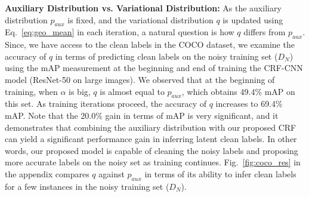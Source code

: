 \documentclass{article}
\begin{document}
\textbf{Auxiliary Distribution vs. Variational Distribution:} As the auxiliary distribution $p_{aux}$ is fixed, and the variational distribution $q$ is updated using Eq.~\ref{eq:geo_mean} 
in each iteration, a natural question is how $q$ differs from $p_{aux}$. Since, we have access to the clean labels in the 
COCO dataset, we examine the accuracy of $q$ in terms of predicting clean labels on the noisy training set ($D_N$) using the mAP measurement at the beginning and end of training
the CRF-CNN model (ResNet-50 on large images). We observed that at the beginning of training, when $\alpha$ is big, $q$ is almost equal to $p_{aux}$, which obtains 49.4\% mAP on this set.
As training iterations proceed, the accuracy of $q$ increases to 69.4\% mAP. Note that the 20.0\% gain in terms of mAP is very significant, and it demonstrates 
that combining the auxiliary distribution with our proposed CRF can yield a significant performance gain in inferring latent clean labels. In other words,
our proposed model is capable of cleaning the noisy labels and proposing more accurate labels on the noisy set as training continues.
Fig.~\ref{fig:coco_res} in the appendix compares $q$ against $p_{aux}$ in terms of its ability to infer clean labels for a few instances in the noisy training set ($D_N$).
\end{document}
